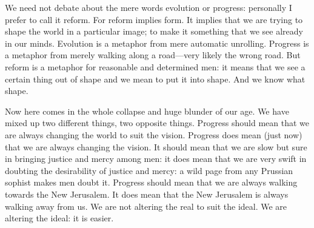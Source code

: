 \documentclass{book}
\begin{document}
We need not debate about the mere words evolution or progress: personally I prefer to call it reform. For reform implies form. It implies that we are trying to shape the world in a particular image; to make it something that we see already in our minds. Evolution is a metaphor from mere automatic unrolling. Progress is a metaphor from merely walking along a road—very likely the wrong road. But reform is a metaphor for reasonable and determined men: it means that we see a certain thing out of shape and we mean to put it into shape. And we know what shape.

Now here comes in the whole collapse and huge blunder of our age. We have mixed up two different things, two opposite things. Progress should mean that we are always changing the world to suit the vision. Progress does mean (just now) that we are always changing the vision. It should mean that we are slow but sure in bringing justice and mercy among men: it does mean that we are very swift in doubting the desirability of justice and mercy: a wild page from any Prussian sophist makes men doubt it. Progress should mean that we are always walking towards the New Jerusalem. It does mean that the New Jerusalem is always walking away from us. We are not altering the real to suit the ideal. We are altering the ideal: it is easier.
\end{document}
